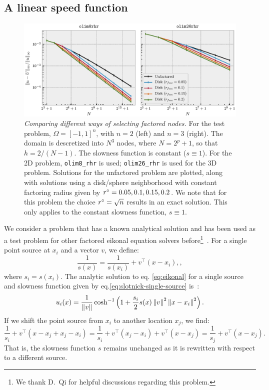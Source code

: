 \documentclass[smallcondensed]{svjour3}
\begin{document}
\subsection{A linear speed function}\label{ssec:slotnick}

\begin{figure}
  \centering
  \includegraphics[width=\linewidth]{factoring-error-example.eps}%
  \caption{\emph{Comparing different ways of selecting factored
      nodes.} For the test problem, $\Omega = [-1, 1]^n$, with $n = 2$
    (left) and $n = 3$ (right). The domain is descretized into $N^3$
    nodes, where $N = 2^p + 1$, so that $h = 2/(N - 1)$. The slowness
    function is constant ($s \equiv 1$). For the 2D problem,
    \texttt{olim8\_rhr} is used; \texttt{olim26\_rhr} is used for the
    3D problem. Solutions for the unfactored problem are plotted,
    along with solutions using a disk/sphere neighborhood with
    constant factoring radius given by $r^\circ = 0.05, 0.1, 0.15,
    0.2$. We note that for this problem the choice $r^\circ = \sqrt{n}$
    results in an exact solution. This only applies to the constant
    slowness function, $s \equiv 1$.
  }\label{fig:factoring-error-example}
\end{figure}

We consider a problem that has a known analytical solution and has
been used as a test problem for other factored eikonal equation
solvers before\footnote{We thank D.\ Qi for helpful discussions
  regarding this
  problem.}~\cite{slotnick1959lessons,fomel2009fast,qi2018corner}. For
a single point source at $x_i$ and a vector $v$, we define:
\begin{equation}
  \label{eq:slotnick-single-source}
  \frac{1}{s(x)} = \frac{1}{s(x_i)} + v^\top {(x - x_i)},,
\end{equation}
where $s_i = s(x_i)$. The analytic solution to eq.\@
\ref{eq:eikonal} for a single source and slowness function given by
eq.\@ \ref{eq:slotnick-single-source}
is~\cite{slotnick1959lessons}:
\begin{equation}
  \label{eq:slotnick-single-source-solution}
  u_i(x) = \frac{1}{\left\|v\right\|} \cosh^{-1} \left(1 + \frac{s_i}{2} s(x) \left\|v\right\|^2 \left\|x - x_i\right\|^2\right).
\end{equation}
If we shift the point source from $x_i$ to another location $x_j$, we
find:
\begin{equation}
  \label{eq:slotnick-slowness-shift}
  \frac{1}{s_i} + v^\top {(x - x_j + x_j - x_i)} = \frac{1}{s_i} + v^\top {(x_j - x_i)} + v^\top {(x - x_j)} = \frac{1}{s_j} + v^\top {(x - x_j)}.
\end{equation}
That is, the slowness function $s$ remains unchanged as it is
rewritten with respect to a different source.
\end{document}
